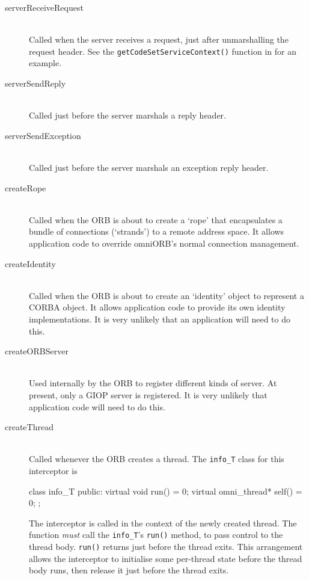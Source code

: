 \documentclass[11pt,oneside,a4paper]{book}
\newcommand{\type}[1]{\texttt{#1}}
\newcommand{\op}[1]{\texttt{#1()}}
\begin{document}
\begin{description}
\item[serverReceiveRequest]\mbox{}\\
%
Called when the server receives a request, just after unmarshalling
the request header. See the \op{getCodeSetServiceContext} function in
 for an example.


\item[serverSendReply]\mbox{}\\
%
Called just before the server marshals a reply header.


\item[serverSendException]\mbox{}\\
%
Called just before the server marshals an exception reply header.


\item[createRope]\mbox{}\\
%
Called when the ORB is about to create a `rope' that encapsulates a
bundle of connections (`strands') to a remote address space. It allows
application code to override omniORB's normal connection management.


\item[createIdentity]\mbox{}\\
%
Called when the ORB is about to create an `identity' object to
represent a CORBA object. It allows application code to provide its
own identity implementations. It is very unlikely that an application
will need to do this.


\item[createORBServer]\mbox{}\\
%
Used internally by the ORB to register different kinds of server. At
present, only a GIOP server is registered. It is very unlikely that
application code will need to do this.


\item[createThread]\mbox{}\\
%
Called whenever the ORB creates a thread. The \type{info\_T} class for
this interceptor is

\begin{cxxlisting}
    class info_T {
    public:
      virtual void run() = 0;
      virtual omni_thread* self() = 0;
    };
\end{cxxlisting}

\noindent
The interceptor is called in the context of the newly created thread.
The function \emph{must} call the \type{info\_T}'s \op{run} method, to
pass control to the thread body. \op{run} returns just before the
thread exits. This arrangement allows the interceptor to initialise
some per-thread state before the thread body runs, then release it
just before the thread exits.


\end{description}
\end{document}
